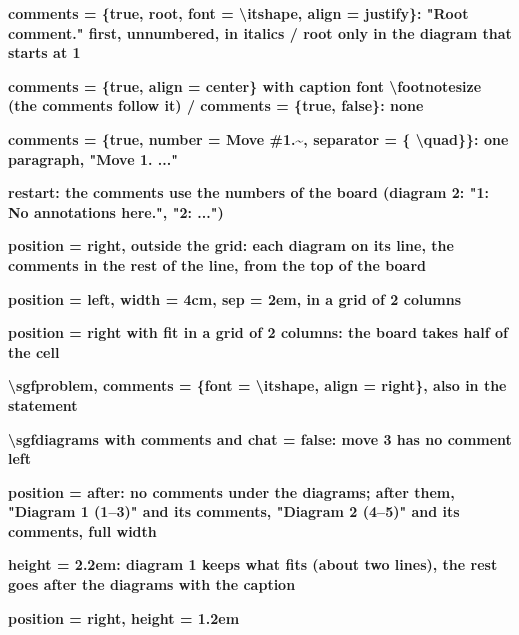 \documentclass{article}
\newcommand\case[1]{\par\medskip\noindent\textbf{#1}\par\nopagebreak}
\begin{document}
\case{comments = \{true, root, font = \textbackslash itshape, align = justify\}: "Root comment." first, unnumbered, in italics / root only in the diagram that starts at 1}

\case{comments = \{true, align = center\} with caption font \textbackslash footnotesize (the comments follow it) / comments = \{true, false\}: none}

\case{comments = \{true, number = Move \#1.\textasciitilde, separator = \{ \textbackslash quad\}\}: one paragraph, "Move 1. ..."}

\case{restart: the comments use the numbers of the board (diagram 2: "1: No annotations here.", "2: ...")}

\case{position = right, outside the grid: each diagram on its line, the comments in the rest of the line, from the top of the board}

\case{position = left, width = 4cm, sep = 2em, in a grid of 2 columns}

\case{position = right with fit in a grid of 2 columns: the board takes half of the cell}

\case{\textbackslash sgfproblem, comments = \{font = \textbackslash itshape, align = right\}, also in the statement}

\case{\textbackslash sgfdiagrams with comments and chat = false: move 3 has no comment left}

\case{position = after: no comments under the diagrams; after them, "Diagram 1 (1--3)" and its comments, "Diagram 2 (4--5)" and its comments, full width}

\case{height = 2.2em: diagram 1 keeps what fits (about two lines), the rest goes after the diagrams with the caption}

\case{position = right, height = 1.2em}
\end{document}

